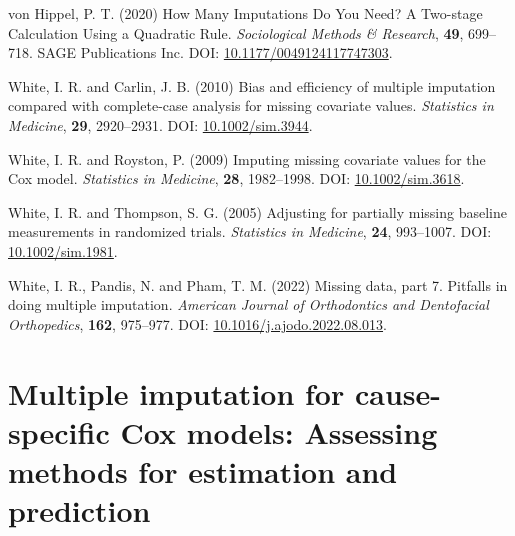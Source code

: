 \documentclass[
  letterpaper,
  DIV=11,
  numbers=noendperiod]{scrreprt}
\newlength{\cslhangindent}
\newlength{\cslentryspacingunit} %
\newenvironment{CSLReferences}[2] %
 {%
  \setlength{\parindent}{0pt}
  \ifodd #1
  \let\oldpar\par
  \def\par{\hangindent=\cslhangindent\oldpar}
  \fi
  \setlength{\parskip}{#2\cslentryspacingunit}
 }%
 {}
\begin{document}
\begin{CSLReferences}{1}{0}
\leavevmode{}%
von Hippel, P. T. (2020) How {Many Imputations Do You Need}? {A
Two-stage Calculation Using} a {Quadratic Rule}. \emph{Sociological
Methods \& Research}, \textbf{49}, 699--718. SAGE Publications Inc. DOI:
\href{https://doi.org/10.1177/0049124117747303}{10.1177/0049124117747303}.

\leavevmode{}%
White, I. R. and Carlin, J. B. (2010) Bias and efficiency of multiple
imputation compared with complete-case analysis for missing covariate
values. \emph{Statistics in Medicine}, \textbf{29}, 2920--2931. DOI:
\href{https://doi.org/10.1002/sim.3944}{10.1002/sim.3944}.

\leavevmode{}%
White, I. R. and Royston, P. (2009) Imputing missing covariate values
for the {Cox} model. \emph{Statistics in Medicine}, \textbf{28},
1982--1998. DOI:
\href{https://doi.org/10.1002/sim.3618}{10.1002/sim.3618}.

\leavevmode{}%
White, I. R. and Thompson, S. G. (2005) Adjusting for partially missing
baseline measurements in randomized trials. \emph{Statistics in
Medicine}, \textbf{24}, 993--1007. DOI:
\href{https://doi.org/10.1002/sim.1981}{10.1002/sim.1981}.

\leavevmode{}%
White, I. R., Pandis, N. and Pham, T. M. (2022) Missing data, part 7.
{Pitfalls} in doing multiple imputation. \emph{American Journal of
Orthodontics and Dentofacial Orthopedics}, \textbf{162}, 975--977. DOI:
\href{https://doi.org/10.1016/j.ajodo.2022.08.013}{10.1016/j.ajodo.2022.08.013}.

\end{CSLReferences}


\hypertarget{multiple-imputation-for-cause-specific-cox-models-assessing-methods-for-estimation-and-prediction}{%
\chapter{Multiple imputation for cause-specific Cox models: Assessing
methods for estimation and
prediction}\label{multiple-imputation-for-cause-specific-cox-models-assessing-methods-for-estimation-and-prediction}}
\end{document}
